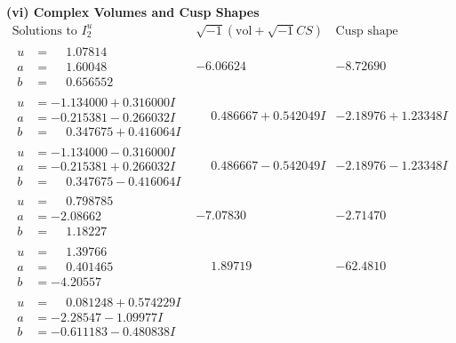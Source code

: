 \documentclass[1p]{elsarticle_modified}
\theoremstyle{definition}
\newcommand{\I}{\sqrt{-1}}
\begin{document}
\newpage\flushleft \textbf{(vi) Complex Volumes and Cusp Shapes}
$$\begin{array}{c|c|c}  
\text{Solutions to }I^u_{2}& \I (\text{vol} + \sqrt{-1}CS) & \text{Cusp shape}\\
 \hline 
\begin{aligned}
u &= \phantom{-}1.07814\phantom{ +0.000000I} \\
a &= \phantom{-}1.60048\phantom{ +0.000000I} \\
b &= \phantom{-}0.656552\phantom{ +0.000000I}\end{aligned}
 & -6.06624\phantom{ +0.000000I} & -8.72690\phantom{ +0.000000I} \\ \hline\begin{aligned}
u &= -1.134000 + 0.316000 I \\
a &= -0.215381 - 0.266032 I \\
b &= \phantom{-}0.347675 + 0.416064 I\end{aligned}
 & \phantom{-}0.486667 + 0.542049 I & -2.18976 + 1.23348 I \\ \hline\begin{aligned}
u &= -1.134000 - 0.316000 I \\
a &= -0.215381 + 0.266032 I \\
b &= \phantom{-}0.347675 - 0.416064 I\end{aligned}
 & \phantom{-}0.486667 - 0.542049 I & -2.18976 - 1.23348 I \\ \hline\begin{aligned}
u &= \phantom{-}0.798785\phantom{ +0.000000I} \\
a &= -2.08662\phantom{ +0.000000I} \\
b &= \phantom{-}1.18227\phantom{ +0.000000I}\end{aligned}
 & -7.07830\phantom{ +0.000000I} & -2.71470\phantom{ +0.000000I} \\ \hline\begin{aligned}
u &= \phantom{-}1.39766\phantom{ +0.000000I} \\
a &= \phantom{-}0.401465\phantom{ +0.000000I} \\
b &= -4.20557\phantom{ +0.000000I}\end{aligned}
 & \phantom{-}1.89719\phantom{ +0.000000I} & -62.4810\phantom{ +0.000000I} \\ \hline\begin{aligned}
u &= \phantom{-}0.081248 + 0.574229 I \\
a &= -2.28547 - 1.09977 I \\
b &= -0.611183 - 0.480838 I\end{aligned}

\end{array}$$
\end{document}
